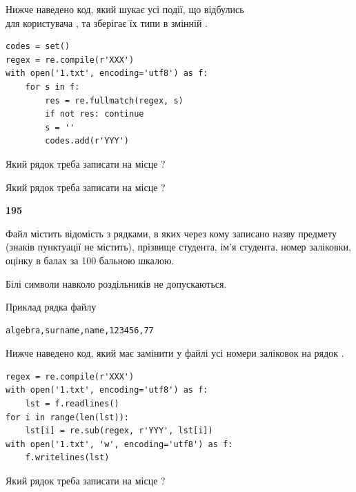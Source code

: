 Нижче наведено код, який шукає усі події, що відбулись\\ для користувача , та зберігає їх типи в змінній .



\begin{verbatim}
codes = set()
regex = re.compile(r'XXX')
with open('1.txt', encoding='utf8') as f:
    for s in f:
        res = re.fullmatch(regex, s)
        if not res: continue
        s = ''
        codes.add(r'YYY')
\end{verbatim}





Який рядок треба записати на місце  ?\par
\vspace{5mm}


Який рядок треба записати на місце  ?\par


\newpage

{\begin {center}\textbf{ 195}\end {center}}\par
Файл  містить відомість з рядками, в яких через кому записа\-но назву предмету (знаків пунктуації не містить), прізвище студента, ім'я студента, номер залі\-ков\-ки, оцінку в балах за 100 бальною шкалою.

Білі символи навколо роздільників не допускаються.

Приклад рядка файлу



\begin{verbatim}
algebra,surname,name,123456,77
\end{verbatim}


Нижче наведено код, який має замінити у файлі усі номери заліковок на рядок \code{***}.



\begin{verbatim}
regex = re.compile(r'XXX')
with open('1.txt', encoding='utf8') as f:
    lst = f.readlines()
for i in range(len(lst)):
    lst[i] = re.sub(regex, r'YYY', lst[i])
with open('1.txt', 'w', encoding='utf8') as f:
    f.writelines(lst)
\end{verbatim}







Який рядок треба записати на місце  ?\par
\vspace{5mm}


